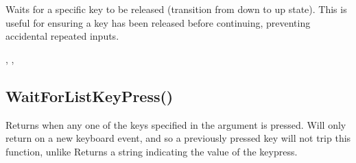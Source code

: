 \documentclass[letterpaper,10pt,english]{sphinxmanual}
\begin{document}
\sphinxAtStartPar
Waits for a specific key to be released (transition from down to up state). This is useful for ensuring a key has been released before continuing, preventing accidental repeated inputs.

\sphinxAtStartPar
{}

\begin{sphinxVerbatim}[commandchars=\\\{\}]
\end{sphinxVerbatim}

\sphinxAtStartPar
{}

\begin{sphinxVerbatim}[commandchars=\\\{\}]
\end{sphinxVerbatim}

\sphinxAtStartPar
{}

\sphinxAtStartPar
{}, , 

\ignorespaces 

\subsection{WaitForListKeyPress()}
\label{\detokenize{reference/peblenvironment:waitforlistkeypress}}\label{\detokenize{reference/peblenvironment:index-79}}
\sphinxAtStartPar
{}

\sphinxAtStartPar
Returns when any one of the keys specified in the   argument is pressed. Will only return on a new keyboard event, and   so a previously pressed key will not trip this function, unlike     Returns a string indicating the value   of the keypress.

\sphinxAtStartPar
{}

\begin{sphinxVerbatim}[commandchars=\\\{\}]
\end{sphinxVerbatim}
\end{document}
